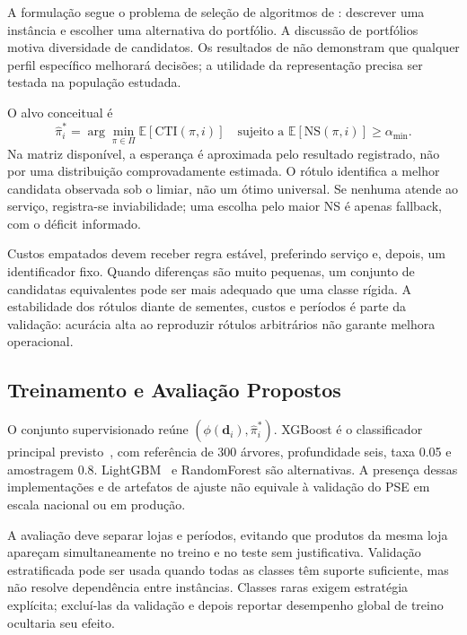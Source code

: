 A formulação segue o problema de seleção de algoritmos de \citet{Rice1976AlgorithmSelection}: descrever uma instância e escolher uma alternativa do portfólio. A discussão de portfólios~\citep{Huberman1997AlgorithmPortfolios} motiva diversidade de candidatos. Os resultados de \citet{Wolpert1997NoFreeLunch} não demonstram que qualquer perfil específico melhorará decisões; a utilidade da representação precisa ser testada na população estudada.

O alvo conceitual é
\begin{equation}
\hat\pi_i^*=\arg\min_{\pi\in\Pi}\mathbb E[\mathrm{CTI}(\pi,i)]
\quad\text{sujeito a }\mathbb E[\mathrm{NS}(\pi,i)]\geq\alpha_{\min}.
\label{eq:policy_selector}
\end{equation}
Na matriz disponível, a esperança é aproximada pelo resultado registrado, não por uma distribuição comprovadamente estimada. O rótulo identifica a melhor candidata observada sob o limiar, não um ótimo universal. Se nenhuma atende ao serviço, registra-se inviabilidade; uma escolha pelo maior NS é apenas fallback, com o déficit informado.

Custos empatados devem receber regra estável, preferindo serviço e, depois, um identificador fixo. Quando diferenças são muito pequenas, um conjunto de candidatas equivalentes pode ser mais adequado que uma classe rígida. A estabilidade dos rótulos diante de sementes, custos e períodos é parte da validação: acurácia alta ao reproduzir rótulos arbitrários não garante melhora operacional.

\subsection{Treinamento e Avaliação Propostos}

O conjunto supervisionado reúne $(\phi(\mathbf d_i),\hat\pi_i^*)$. XGBoost é o classificador principal previsto~\citep{ChenGuestrin2016XGBoost}, com referência de 300 árvores, profundidade seis, taxa 0.05 e amostragem 0.8. LightGBM~\citep{Ke2017LightGBM} e RandomForest são alternativas. A presença dessas implementações e de artefatos de ajuste não equivale à validação do PSE em escala nacional ou em produção.

A avaliação deve separar lojas e períodos, evitando que produtos da mesma loja apareçam simultaneamente no treino e no teste sem justificativa. Validação estratificada pode ser usada quando todas as classes têm suporte suficiente, mas não resolve dependência entre instâncias. Classes raras exigem estratégia explícita; excluí-las da validação e depois reportar desempenho global de treino ocultaria seu efeito.

